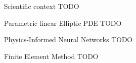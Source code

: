 \begin{frame}{Scientific context}
	TODO
\end{frame}

\begin{frame}{Parametric linear Elliptic PDE}
	TODO
\end{frame}

\begin{frame}{Physics-Informed Neural Networks}
	TODO
\end{frame}

\begin{frame}{Finite Element Method}
	TODO
\end{frame}
